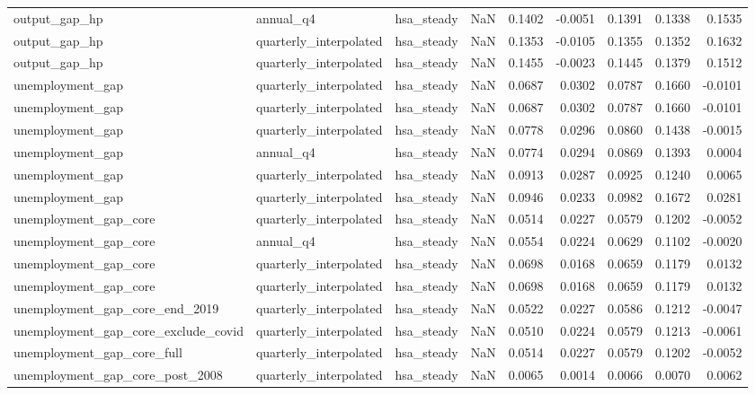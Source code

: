 \begin{tabular}{lllrrrrrr}
output\_gap\_hp & annual\_q4 & hsa\_steady & NaN & 0.1402 & -0.0051 & 0.1391 & 0.1338 & 0.1535 \\
output\_gap\_hp & quarterly\_interpolated & hsa\_steady & NaN & 0.1353 & -0.0105 & 0.1355 & 0.1352 & 0.1632 \\
output\_gap\_hp & quarterly\_interpolated & hsa\_steady & NaN & 0.1455 & -0.0023 & 0.1445 & 0.1379 & 0.1512 \\
unemployment\_gap & quarterly\_interpolated & hsa\_steady & NaN & 0.0687 & 0.0302 & 0.0787 & 0.1660 & -0.0101 \\
unemployment\_gap & quarterly\_interpolated & hsa\_steady & NaN & 0.0687 & 0.0302 & 0.0787 & 0.1660 & -0.0101 \\
unemployment\_gap & quarterly\_interpolated & hsa\_steady & NaN & 0.0778 & 0.0296 & 0.0860 & 0.1438 & -0.0015 \\
unemployment\_gap & annual\_q4 & hsa\_steady & NaN & 0.0774 & 0.0294 & 0.0869 & 0.1393 & 0.0004 \\
unemployment\_gap & quarterly\_interpolated & hsa\_steady & NaN & 0.0913 & 0.0287 & 0.0925 & 0.1240 & 0.0065 \\
unemployment\_gap & quarterly\_interpolated & hsa\_steady & NaN & 0.0946 & 0.0233 & 0.0982 & 0.1672 & 0.0281 \\
unemployment\_gap\_core & quarterly\_interpolated & hsa\_steady & NaN & 0.0514 & 0.0227 & 0.0579 & 0.1202 & -0.0052 \\
unemployment\_gap\_core & annual\_q4 & hsa\_steady & NaN & 0.0554 & 0.0224 & 0.0629 & 0.1102 & -0.0020 \\
unemployment\_gap\_core & quarterly\_interpolated & hsa\_steady & NaN & 0.0698 & 0.0168 & 0.0659 & 0.1179 & 0.0132 \\
unemployment\_gap\_core & quarterly\_interpolated & hsa\_steady & NaN & 0.0698 & 0.0168 & 0.0659 & 0.1179 & 0.0132 \\
unemployment\_gap\_core\_end\_2019 & quarterly\_interpolated & hsa\_steady & NaN & 0.0522 & 0.0227 & 0.0586 & 0.1212 & -0.0047 \\
unemployment\_gap\_core\_exclude\_covid & quarterly\_interpolated & hsa\_steady & NaN & 0.0510 & 0.0224 & 0.0579 & 0.1213 & -0.0061 \\
unemployment\_gap\_core\_full & quarterly\_interpolated & hsa\_steady & NaN & 0.0514 & 0.0227 & 0.0579 & 0.1202 & -0.0052 \\
unemployment\_gap\_core\_post\_2008 & quarterly\_interpolated & hsa\_steady & NaN & 0.0065 & 0.0014 & 0.0066 & 0.0070 & 0.0062 \\

\end{tabular}
